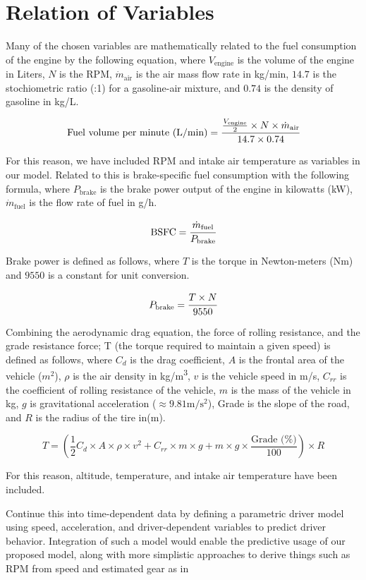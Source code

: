\documentclass[letterpaper]{article}
\begin{document}
\section*{Relation of Variables}

Many of the chosen variables are mathematically related to the fuel 
consumption of the engine by the following equation, where 
$V_{\mathrm{engine}}$ is the volume of the engine in Liters, $N$ is the 
RPM, $\dot{m}_{\mathrm{air}}$ is the air mass flow rate in kg/min, $14.7$ 
is the stochiometric ratio (:1) for a gasoline-air mixture, and $0.74$ is 
the density of gasoline in kg/L.

\[
\text{Fuel volume per minute (L/min)} = \cfrac{\frac{V_{\mathrm{engine}}}{2} \times N \times \dot{m}_{\mathrm{air}}}{14.7\times 0.74}
\]

For this reason, we have included RPM and intake air temperature as 
variables in our model. Related to this is brake-specific fuel consumption 
with the following formula, where $P_{\mathrm{brake}}$ is the brake power 
output of the engine in kilowatts (kW), $\dot{m}_{\mathrm{fuel}}$ is the 
flow rate of fuel in g/h.

\[
\mathrm{BSFC} = \cfrac{\dot{m}_{\mathrm{fuel}}}{P_{\mathrm{brake}}}
\]

Brake power is defined as follows, where $T$ is the torque in Newton-meters 
(Nm) and $9550$ is a constant for unit conversion.

\[
P_{\mathrm{brake}} = \cfrac{T \times N}{9550}
\]

Combining the aerodynamic drag equation, the force of rolling resistance, 
and the grade resistance force; T (the torque required to maintain a given 
speed) is defined as follows, where $C_d$ is the 
drag coefficient, $A$ is the frontal area of the vehicle ($m^2$), $\rho$ 
is the air density in kg/m\textsuperscript{3}, $v$ is the vehicle speed 
in m/s, $C_{rr}$ is the coefficient of rolling resistance of the vehicle, 
$m$ is the mass of the vehicle in kg, $g$ is gravitational acceleration 
($\approx 9.81 \mathrm{m}/\mathrm{s}^2$), Grade is the slope of the road, 
and $R$ is the radius of the tire in(m).

\[
T = (\frac{1}{2}C_d\times A \times \rho \times v^2 + C_{rr} \times m \times g + m \times g \times \frac{\text{Grade (\%)}}{100})\times R
\]

For this reason, altitude, temperature, and intake air temperature have 
been included. 

\cite{hegde2021real} Continue this into time-dependent data by defining a
parametric driver model using speed, acceleration, and driver-dependent
variables to predict driver behavior. Integration of such a model would
enable the predictive usage of our proposed model, along with more 
simplistic approaches to derive things such as RPM from speed and 
estimated gear as in \cite{rykala2023modeling}
\end{document}
